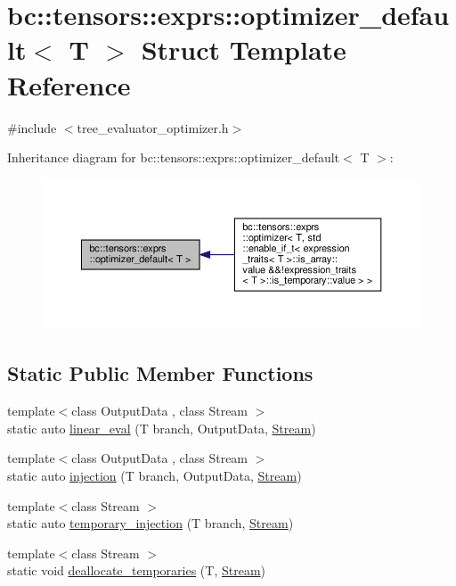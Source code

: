 \hypertarget{structbc_1_1tensors_1_1exprs_1_1optimizer__default}{}\section{bc\+:\+:tensors\+:\+:exprs\+:\+:optimizer\+\_\+default$<$ T $>$ Struct Template Reference}
\label{structbc_1_1tensors_1_1exprs_1_1optimizer__default}


{\ttfamily \#include $<$tree\+\_\+evaluator\+\_\+optimizer.\+h$>$}



Inheritance diagram for bc\+:\+:tensors\+:\+:exprs\+:\+:optimizer\+\_\+default$<$ T $>$\+:\nopagebreak
\begin{figure}[H]
\begin{center}
\leavevmode
\includegraphics[width=350pt]{structbc_1_1tensors_1_1exprs_1_1optimizer__default__inherit__graph}
\end{center}
\end{figure}
\subsection*{Static Public Member Functions}
\begin{DoxyCompactItemize}
\item 
{\footnotesize template$<$class Output\+Data , class Stream $>$ }\\static auto \hyperlink{structbc_1_1tensors_1_1exprs_1_1optimizer__default_a31880c96689c4d99ddd9fdddb0be1303}{linear\+\_\+eval} (T branch, Output\+Data, \hyperlink{classbc_1_1streams_1_1Stream}{Stream})
\item 
{\footnotesize template$<$class Output\+Data , class Stream $>$ }\\static auto \hyperlink{structbc_1_1tensors_1_1exprs_1_1optimizer__default_a9669bd5127ec6b48422735ce8e881005}{injection} (T branch, Output\+Data, \hyperlink{classbc_1_1streams_1_1Stream}{Stream})
\item 
{\footnotesize template$<$class Stream $>$ }\\static auto \hyperlink{structbc_1_1tensors_1_1exprs_1_1optimizer__default_ac88b821b4dd3acfdb3032a93a4023c1f}{temporary\+\_\+injection} (T branch, \hyperlink{classbc_1_1streams_1_1Stream}{Stream})
\item 
{\footnotesize template$<$class Stream $>$ }\\static void \hyperlink{structbc_1_1tensors_1_1exprs_1_1optimizer__default_a24f690395a20095018e132d15e18ee30}{deallocate\+\_\+temporaries} (T, \hyperlink{classbc_1_1streams_1_1Stream}{Stream})
\end{DoxyCompactItemize}
